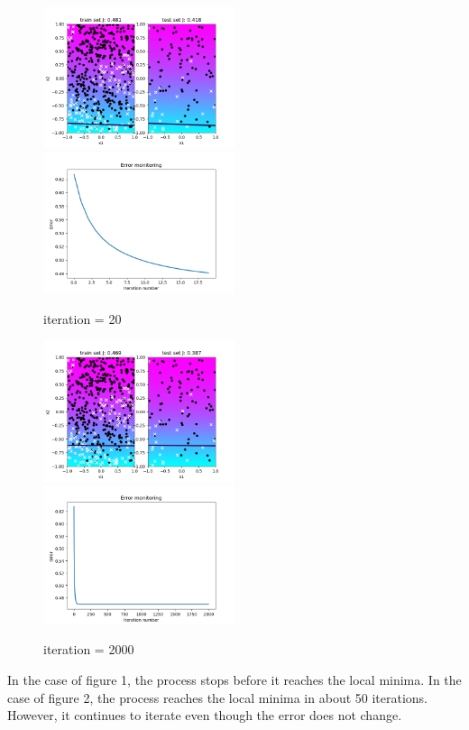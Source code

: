 \documentclass[a4paper]{article}
\begin{document}
\begin{figure}[h]
	\includegraphics[width=0.5\textwidth]{logreg_deg1_iter20.png}
	\includegraphics[width=0.5\textwidth]{logreg_deg1_iter20_error.png}
	\caption{iteration = 20}
\end{figure}
\clearpage
\begin{figure}[h]
	\includegraphics[width=0.5\textwidth]{logreg_deg1_iter2000.png}
	\includegraphics[width=0.5\textwidth]{logreg_deg1_iter2000_error.png}
	\caption{iteration = 2000}
\end{figure}

In the case of figure 1, the process stops before it reaches the local minima. In the case of figure 2, the process reaches the local minima in about 50 iterations. However, it continues to iterate even though the error does not change.  
\end{document}
